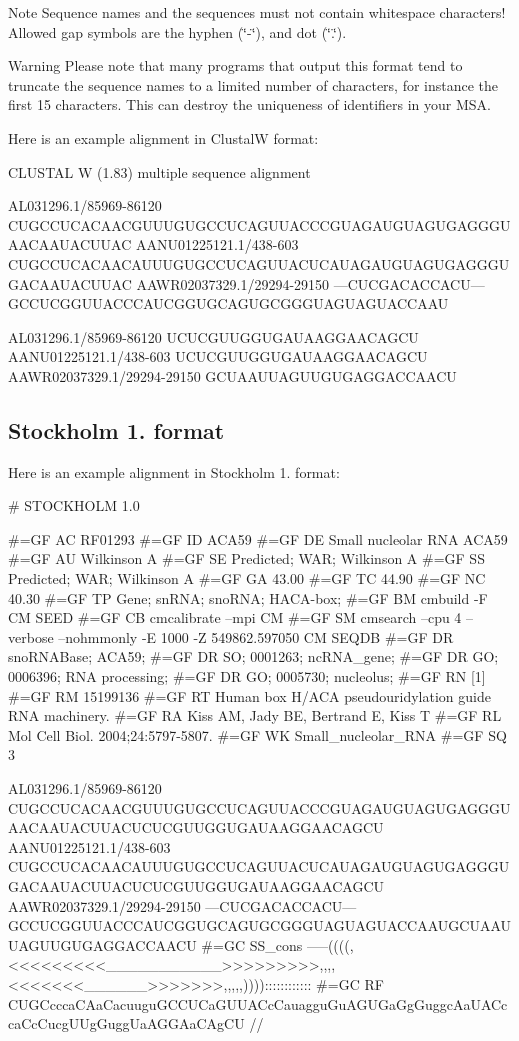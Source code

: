 \begin{DoxyNote}{Note}
Sequence names and the sequences must not contain whitespace characters! Allowed gap symbols are the hyphen {\itshape }(\char`\"{}-\/\char`\"{}), and dot {\itshape }(\char`\"{}.\char`\"{}).
\end{DoxyNote}
\begin{DoxyWarning}{Warning}
Please note that many programs that output this format tend to truncate the sequence names to a limited number of characters, for instance the first 15 characters. This can destroy the uniqueness of identifiers in your M\+SA.
\end{DoxyWarning}
Here is an example alignment in ClustalW format\+: \begin{DoxyVerb}CLUSTAL W (1.83) multiple sequence alignment


AL031296.1/85969-86120      CUGCCUCACAACGUUUGUGCCUCAGUUACCCGUAGAUGUAGUGAGGGUAACAAUACUUAC
AANU01225121.1/438-603      CUGCCUCACAACAUUUGUGCCUCAGUUACUCAUAGAUGUAGUGAGGGUGACAAUACUUAC
AAWR02037329.1/29294-29150  ---CUCGACACCACU---GCCUCGGUUACCCAUCGGUGCAGUGCGGGUAGUAGUACCAAU

AL031296.1/85969-86120      UCUCGUUGGUGAUAAGGAACAGCU
AANU01225121.1/438-603      UCUCGUUGGUGAUAAGGAACAGCU
AAWR02037329.1/29294-29150  GCUAAUUAGUUGUGAGGACCAACU \end{DoxyVerb}
\hypertarget{file_formats_msa-formats-stockholm}{}\subsection{Stockholm 1. format}\label{file_formats_msa-formats-stockholm}
Here is an example alignment in Stockholm 1. format\+: \begin{DoxyVerb}# STOCKHOLM 1.0

#=GF AC   RF01293
#=GF ID   ACA59
#=GF DE   Small nucleolar RNA ACA59
#=GF AU   Wilkinson A
#=GF SE   Predicted; WAR; Wilkinson A
#=GF SS   Predicted; WAR; Wilkinson A
#=GF GA   43.00
#=GF TC   44.90
#=GF NC   40.30
#=GF TP   Gene; snRNA; snoRNA; HACA-box;
#=GF BM   cmbuild -F CM SEED
#=GF CB   cmcalibrate --mpi CM
#=GF SM   cmsearch --cpu 4 --verbose --nohmmonly -E 1000 -Z 549862.597050 CM SEQDB
#=GF DR   snoRNABase; ACA59;
#=GF DR   SO; 0001263; ncRNA_gene;
#=GF DR   GO; 0006396; RNA processing;
#=GF DR   GO; 0005730; nucleolus;
#=GF RN   [1]
#=GF RM   15199136
#=GF RT   Human box H/ACA pseudouridylation guide RNA machinery.
#=GF RA   Kiss AM, Jady BE, Bertrand E, Kiss T
#=GF RL   Mol Cell Biol. 2004;24:5797-5807.
#=GF WK   Small_nucleolar_RNA
#=GF SQ   3


AL031296.1/85969-86120     CUGCCUCACAACGUUUGUGCCUCAGUUACCCGUAGAUGUAGUGAGGGUAACAAUACUUACUCUCGUUGGUGAUAAGGAACAGCU
AANU01225121.1/438-603     CUGCCUCACAACAUUUGUGCCUCAGUUACUCAUAGAUGUAGUGAGGGUGACAAUACUUACUCUCGUUGGUGAUAAGGAACAGCU
AAWR02037329.1/29294-29150 ---CUCGACACCACU---GCCUCGGUUACCCAUCGGUGCAGUGCGGGUAGUAGUACCAAUGCUAAUUAGUUGUGAGGACCAACU
#=GC SS_cons               -----((((,<<<<<<<<<___________>>>>>>>>>,,,,<<<<<<<______>>>>>>>,,,,,))))::::::::::::
#=GC RF                    CUGCcccaCAaCacuuguGCCUCaGUUACcCauagguGuAGUGaGgGuggcAaUACccaCcCucgUUgGuggUaAGGAaCAgCU
//\end{DoxyVerb}


